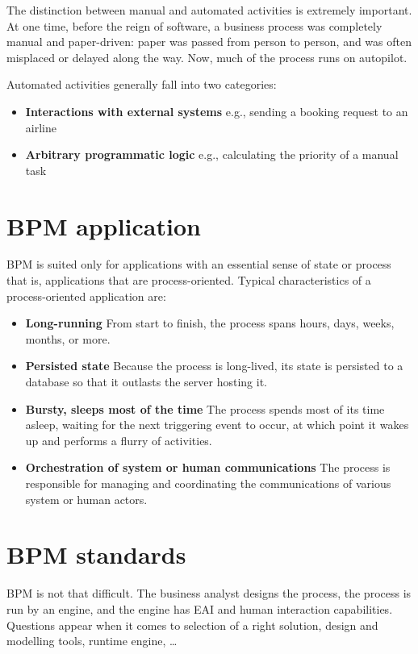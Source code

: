 	The distinction between manual and automated activities is extremely important. At one time, before the reign of
	software, a business process was completely manual and paper-driven: paper was passed from person to person, and was
	often misplaced or delayed along the way. Now, much of the process runs on autopilot.

	Automated activities generally fall into two categories:
	\begin{itemize}
		\item \textbf{Interactions with external systems} e.g., sending a booking request to an airline
		\item \textbf{Arbitrary programmatic logic} e.g., calculating the priority of a manual task	   
	\end{itemize}
	
	\section{BPM application}
	
	BPM is suited only for applications with an essential sense of state or process that is, applications that are
	process-oriented. Typical characteristics of a process-oriented application are:
	
	\begin{itemize}
		\item \textbf{Long-running}
		From start to finish, the process spans hours, days, weeks, months, or more.
		\item \textbf{Persisted state}
		Because the process is long-lived, its state is persisted to a database so that it outlasts the server hosting it.
		\item \textbf{Bursty, sleeps most of the time}
		The process spends most of its time asleep, waiting for the next triggering event to occur, at which point it wakes up
		and performs a flurry of activities.
		\item \textbf{Orchestration of system or human communications}
		The process is responsible for managing and coordinating the communications of various system or human actors.
	\end{itemize}

	\section{BPM standards}
	
	BPM is not that difficult. The business analyst designs the process, the process is run by an engine, and the engine
	has EAI and human interaction capabilities. Questions appear when it comes to selection of a right solution, design and
	modelling tools, runtime engine, \ldots
	
